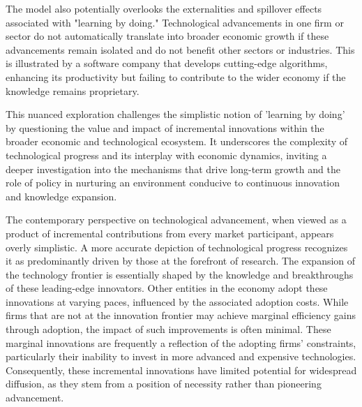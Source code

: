 \documentclass[12pt]{article}
\begin{document}
The model also potentially overlooks the externalities and spillover effects associated with "learning by doing."
Technological advancements in one firm or sector do not automatically translate into broader economic growth if these
advancements remain isolated and do not benefit other sectors or industries. This is illustrated by a software company
that develops cutting-edge algorithms, enhancing its productivity but failing to contribute to the wider economy if the
knowledge remains proprietary.


This nuanced exploration challenges the simplistic notion of 'learning by doing' by questioning the value and impact of
incremental innovations within the broader economic and technological ecosystem. It underscores the complexity of
technological progress and its interplay with economic dynamics, inviting a deeper investigation into the mechanisms
that drive long-term growth and the role of policy in nurturing an environment conducive to continuous innovation and
knowledge expansion. 

The contemporary perspective on technological advancement, when viewed as a product of incremental contributions from
every market participant, appears overly simplistic. A more accurate depiction of technological progress recognizes it
as predominantly driven by those at the forefront of research. The expansion of the technology frontier is essentially
shaped by the knowledge and breakthroughs of these leading-edge innovators. Other entities in the economy adopt these
innovations at varying paces, influenced by the associated adoption costs. While firms that are not at the innovation
frontier may achieve marginal efficiency gains through adoption, the impact of such improvements is often minimal. These
marginal innovations are frequently a reflection of the adopting firms' constraints, particularly their inability to
invest in more advanced and expensive technologies. Consequently, these incremental innovations have limited potential
for widespread diffusion, as they stem from a position of necessity rather than pioneering advancement. 
\end{document}

